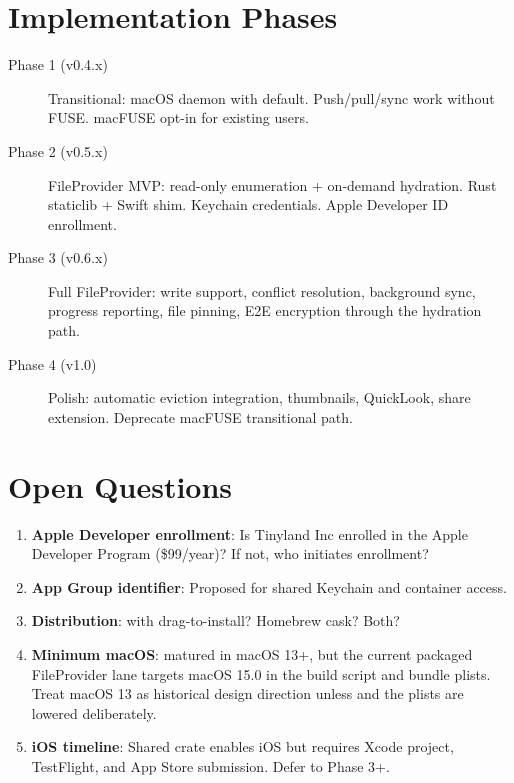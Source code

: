 \documentclass[11pt,a4paper]{article}
\begin{document}
\section{Implementation Phases}

\begin{description}
  \item[Phase 1 (v0.4.x)] Transitional: macOS daemon with 
    default. Push/pull/sync work without FUSE. macFUSE opt-in for existing users.
  \item[Phase 2 (v0.5.x)] FileProvider MVP: read-only enumeration + on-demand
    hydration. Rust staticlib + Swift shim. Keychain credentials. Apple
    Developer ID enrollment.
  \item[Phase 3 (v0.6.x)] Full FileProvider: write support, conflict resolution,
    background sync, progress reporting, file pinning, E2E encryption through
    the hydration path.
  \item[Phase 4 (v1.0)] Polish: automatic eviction integration, thumbnails,
    QuickLook, share extension. Deprecate macFUSE transitional path.
\end{description}

\section{Open Questions}

\begin{enumerate}
  \item \textbf{Apple Developer enrollment}: Is Tinyland Inc enrolled in the
    Apple Developer Program (\$99/year)? If not, who initiates enrollment?
  \item \textbf{App Group identifier}: Proposed
     for shared Keychain and container access.
  \item \textbf{Distribution}:  with drag-to-install? Homebrew cask?
    Both?
  \item \textbf{Minimum macOS}: 
    matured in macOS 13+, but the current packaged FileProvider lane targets
    macOS 15.0 in the build script and bundle plists. Treat macOS 13 as
    historical design direction unless  and the plists are
    lowered deliberately.
  \item \textbf{iOS timeline}: Shared crate enables iOS but requires Xcode
    project, TestFlight, and App Store submission. Defer to Phase 3+.
\end{enumerate}
\end{document}
